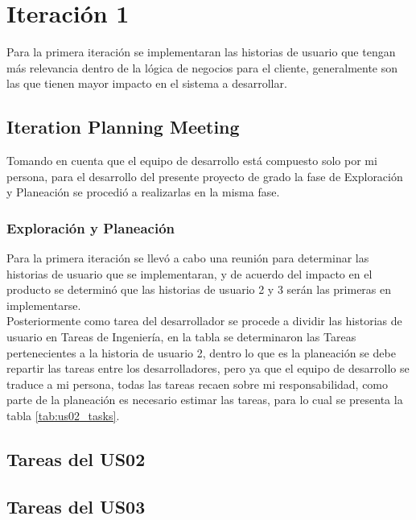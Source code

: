 \section{Iteración 1}
\label{sec:iteracion_1}

Para la primera iteración se implementaran las historias de usuario que tengan más relevancia dentro de la lógica de negocios para el cliente, generalmente son las que tienen mayor impacto en el sistema a desarrollar.


\subsection{Iteration Planning Meeting}
\label{sub:Iteration Planning Meeting}


Tomando en cuenta que el equipo de desarrollo está compuesto solo por mi persona, para el desarrollo del presente proyecto de grado la fase de Exploración y Planeación se procedió a realizarlas en la misma fase.

  \subsubsection{Exploración y Planeación}
  \label{subs:Exploración y Planeación}

Para la primera iteración se llevó a cabo una reunión para determinar las historias de usuario que se implementaran, y de acuerdo del impacto en el producto se determinó que las historias de usuario 2 y 3 serán las primeras en implementarse. \\

Posteriormente como tarea del desarrollador se procede a dividir las historias de usuario en Tareas de Ingeniería, en la tabla se determinaron las Tareas pertenecientes a la historia de usuario 2, dentro lo que es la planeación se debe repartir las tareas entre los desarrolladores, pero ya que el equipo de desarrollo se traduce a mi persona, todas las tareas recaen sobre mi responsabilidad, como parte de la planeación es necesario estimar las tareas, para lo cual se presenta la tabla \ref{tab:us02_tasks}. \\


  \subsection{Tareas del US02}
  \label{sub:us02_tasks}

    

  \subsection{Tareas del US03}
  \label{sub:us03_tasks}

